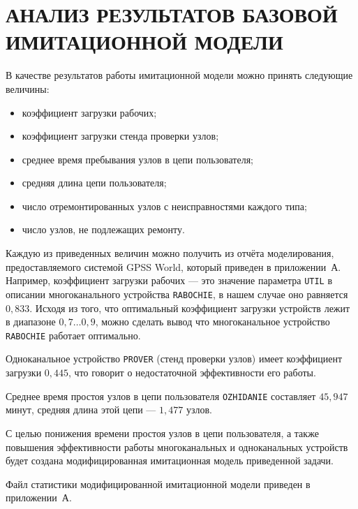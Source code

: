 \section[Анализ результатов базовой имитационной модели]
{АНАЛИЗ РЕЗУЛЬТАТОВ БАЗОВОЙ \\ ИМИТАЦИОННОЙ МОДЕЛИ}

В качестве результатов работы имитационной модели можно принять следующие
величины:
\begin{itemize}
  \item коэффициент загрузки рабочих;
  \item коэффициент загрузки стенда проверки узлов;
  \item среднее время пребывания узлов в цепи пользователя;
  \item средняя длина цепи пользователя;
  \item число отремонтированных узлов с неисправностями каждого типа;
  \item число узлов, не подлежащих ремонту.
\end{itemize}

Каждую из приведенных величин можно получить из отчёта моделирования,
предоставляемого системой GPSS World, который приведен в приложении~А.
Например, коэффициент загрузки рабочих --- это значение параметра \texttt{UTIL}
в описании многоканального устройства \texttt{RABOCHIE}, в нашем случае
оно равняется $ 0{,}833 $. Исходя из того, что оптимальный коэффициент
загрузки устройств лежит в диапазоне $ 0{,}7 \dots 0{,}9 $, можно сделать
вывод что многоканальное устройство \texttt{RABOCHIE} работает оптимально.

Одноканальное устройство \texttt{PROVER} (стенд проверки узлов) имеет коэффициент
загрузки $ 0{,}445 $, что говорит о недостаточной эффективности его работы.

Среднее время простоя узлов в цепи пользователя \texttt{OZHIDANIE} составляет
$ 45{,}947 $ минут, средняя длина этой цепи --- $ 1{,}477 $ узлов.

С целью понижения времени простоя узлов в цепи пользователя, а также повышения
эффективности работы многоканальных и одноканальных устройств будет создана
модифицированная имитационная модель приведенной задачи.

Файл статистики модифицированной имитационной модели приведен в приложении~А.

\newpage

